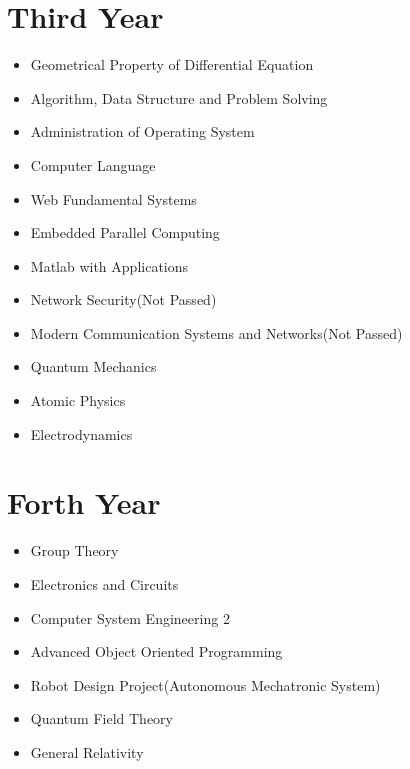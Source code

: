 \documentclass{article}
\begin{document}
\section{Third Year}
\begin{itemize}
	\item
		Geometrical Property of Differential Equation
	\item
		Algorithm, Data Structure and Problem Solving
	\item
		Administration of Operating System
	\item
		Computer Language
	\item
		Web Fundamental Systems
	\item
		Embedded Parallel Computing
	\item
		Matlab with Applications
	\item
		Network Security(Not Passed)
	\item
		Modern Communication Systems and Networks(Not Passed)
	\item
		Quantum Mechanics
	\item
		Atomic Physics
	\item
		Electrodynamics
\end{itemize}

\section{Forth Year}
\begin{itemize}
	\item
		Group Theory
	\item
		Electronics and Circuits
	\item
		Computer System Engineering 2
	\item
		Advanced Object Oriented Programming
	\item
		Robot Design Project(Autonomous Mechatronic System)
	\item
		Quantum Field Theory
	\item
		General Relativity
\end{itemize}
\end{document}

